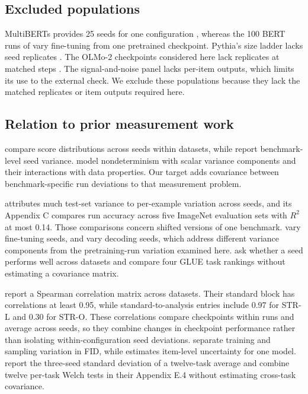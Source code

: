 \subsection{Excluded populations}
MultiBERTs provides 25 seeds for one configuration \citep{sellam2022}, whereas the 100 BERT runs of \citet{mccoy2020} vary fine-tuning from one pretrained checkpoint. Pythia's size ladder lacks seed replicates \citep{biderman2023}. The OLMo-2 checkpoints considered here lack replicates at matched steps \citep{teamolmo2025}. The signal-and-noise panel lacks per-item outputs, which limits its use to the external check. We exclude these populations because they lack the matched replicates or item outputs required here.

\subsection{Relation to prior measurement work}
\citet{reimers2017} compare score distributions across seeds within datasets, while \citet{madaan2024} report benchmark-level seed variance. \citet{hagmann2023} model nondeterminism with scalar variance components and their interactions with data properties. Our target adds covariance between benchmark-specific run deviations to that measurement problem.

\citet{jordan2024} attributes much test-set variance to per-example variation across seeds, and its Appendix C compares run accuracy across five ImageNet evaluation sets with $R^2$ at most 0.14. Those comparisons concern shifted versions of one benchmark. \citet{bui2025} vary fine-tuning seeds, and \citet{hochlehnert2025} vary decoding seeds, which address different variance components from the pretraining-run variation examined here. \citet[Section 4.3]{dodge2020} ask whether a seed performs well across datasets and compare four GLUE task rankings without estimating a covariance matrix.

\citet[Figure 3]{zhou2020} report a Spearman correlation matrix across datasets. Their standard block has correlations at least 0.95, while standard-to-analysis entries include 0.97 for STR-L and 0.30 for STR-O. These correlations compare checkpoints within runs and average across seeds, so they combine changes in checkpoint performance rather than isolating within-configuration seed deviations. \citet{dufour2026} separate training and sampling variation in FID, while \citet{miller2024} estimates item-level uncertainty for one model. \citet{zhao2026} report the three-seed standard deviation of a twelve-task average and combine twelve per-task Welch tests in their Appendix E.4 without estimating cross-task covariance.

